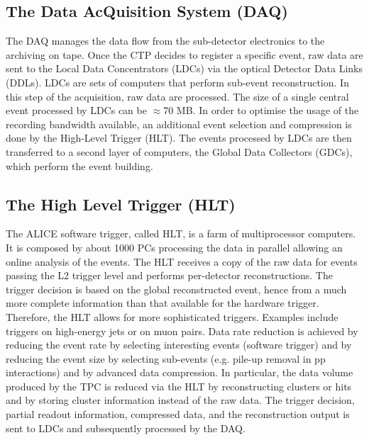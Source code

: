 \subsection{The Data AcQuisition System (DAQ)}
\label{sec:DAQ}
The DAQ manages the data flow from the sub-detector electronics to the archiving
 on tape. Once the CTP decides to register a specific event, raw data are sent to 
 the Local Data Concentrators (LDCs) via the optical Detector Data Links (DDLs). 
 LDCs are sets of computers that perform sub-event reconstruction. In this step of 
 the acquisition, raw data are processed. The size of a single central event processed 
 by LDCs can be $\approx$70 MB. In order to optimise the usage of the recording bandwidth available, 
 an additional event selection and compression is done by the High-Level Trigger (HLT).
The events processed by LDCs are then transferred to a second layer of computers, the Global Data Collectors 
 (GDCs), which perform the event building.
  
 \subsection{The High Level Trigger (HLT)}
\label{sec:HLT}
The ALICE software trigger, called HLT, is a farm of multiprocessor computers. 
It is composed by about 1000 PCs processing the data in parallel allowing an 
online analysis of the events. The HLT receives a copy of the raw data for events passing the L2 trigger level
and performs per-detector reconstructions. The trigger decision is based on 
the global reconstructed event, hence from a much more complete 
information than that available for the hardware trigger. Therefore, the HLT allows for more 
sophisticated triggers. Examples include triggers on high-energy jets or on muon pairs. 
Data rate reduction is achieved by reducing the event rate by selecting interesting events 
(software trigger) and by reducing the event size by selecting sub-events (e.g. pile-up 
removal in pp interactions) and by advanced data compression. In particular,
the data volume produced by the TPC is reduced via the HLT by reconstructing 
clusters or hits and by storing cluster information instead of the raw data.
The trigger decision, partial readout information, compressed data, and the reconstruction output is sent to LDCs and 
subsequently processed by the DAQ. 

